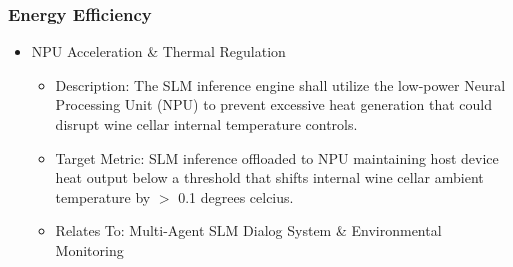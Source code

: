 \documentclass[conference]{IEEEtran}
\begin{document}
\subsubsection{Energy Efficiency}
\begin{itemize}
    \item NPU Acceleration \& Thermal Regulation
    \begin{itemize}
        \item Description: The SLM inference engine shall utilize the low-power Neural Processing Unit (NPU) to prevent excessive heat generation that could disrupt wine cellar internal temperature controls.
        \item Target Metric: SLM inference offloaded to NPU maintaining host device heat output below a threshold that shifts internal wine cellar ambient temperature by $>$ 0.1 degrees celcius.
        \item Relates To: Multi-Agent SLM Dialog System \& Environmental Monitoring
    \end{itemize}
\end{itemize}
\end{document}
